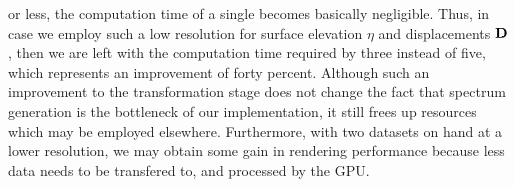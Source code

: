 or less, the computation time of a single \IDFT becomes basically negligible.
Thus, in case we employ such a low resolution for surface elevation $\eta$ and
displacements $\mathbf{D}$, then we are left with the computation time required
by three \IDFTs instead of five, which represents an improvement of forty percent.
Although such an improvement to the transformation stage does not change
the fact that spectrum generation is the bottleneck of our implementation,
it still frees up resources which may be employed elsewhere.
Furthermore, with two datasets on hand at a lower resolution, we may obtain some
gain in rendering performance because less data needs to be transfered to,
and processed by the GPU.
%
%


